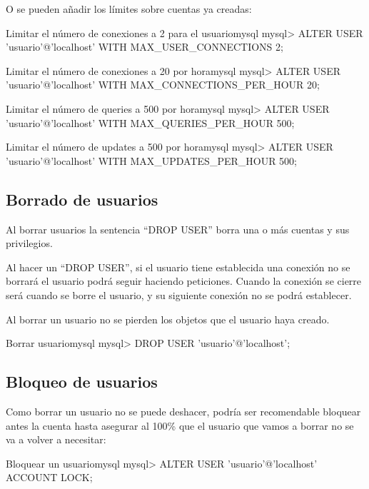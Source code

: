 O se pueden añadir los límites sobre cuentas ya creadas:


\begin{mycode}{Limitar el número de conexiones a 2 para el usuario}{mysql}{}
mysql> ALTER USER 'usuario'@'localhost' WITH MAX_USER_CONNECTIONS 2;
\end{mycode}

\begin{mycode}{Limitar el número de conexiones a 20 por hora}{mysql}{{\small }}
mysql> ALTER USER 'usuario'@'localhost' WITH MAX_CONNECTIONS_PER_HOUR 20;
\end{mycode}

\begin{mycode}{Limitar el número de queries a 500 por hora}{mysql}{}
mysql> ALTER USER 'usuario'@'localhost' WITH MAX_QUERIES_PER_HOUR 500;
\end{mycode}


\begin{mycode}{Limitar el número de updates a 500 por hora}{mysql}{}
mysql> ALTER USER 'usuario'@'localhost' WITH MAX_UPDATES_PER_HOUR 500;
\end{mycode}


\subsection{Borrado de usuarios}
Al borrar usuarios la sentencia “DROP USER” borra una o más cuentas y sus privilegios.

Al hacer un “DROP USER”, si el usuario tiene establecida una conexión no se borrará el usuario podrá seguir haciendo peticiones. Cuando la conexión se cierre será cuando se borre el usuario, y su siguiente conexión no se podrá establecer.

Al borrar un usuario no se pierden los objetos que el usuario haya creado.

\begin{mycode}{Borrar usuario}{mysql}{}
mysql> DROP USER 'usuario'@'localhost';
\end{mycode}


\subsection{Bloqueo de usuarios}
Como borrar un usuario no se puede deshacer, podría ser recomendable bloquear antes la cuenta hasta asegurar al 100\% que el usuario que vamos a borrar no se va a volver a necesitar:

\begin{mycode}{Bloquear un usuario}{mysql}{}
mysql> ALTER USER 'usuario'@'localhost' ACCOUNT LOCK;
\end{mycode}


